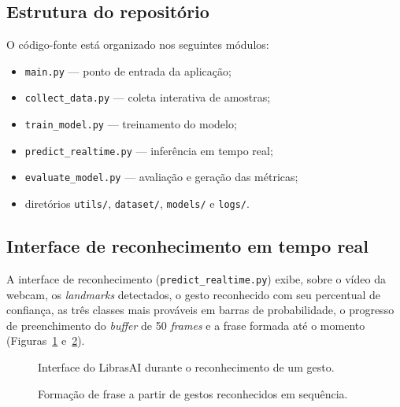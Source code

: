 \subsection{Estrutura do repositório}

O código-fonte está organizado nos seguintes módulos:

\begin{itemize}[leftmargin=2cm]
  \item \texttt{main.py} — ponto de entrada da aplicação;
  \item \texttt{collect\_data.py} — coleta interativa de amostras;
  \item \texttt{train\_model.py} — treinamento do modelo;
  \item \texttt{predict\_realtime.py} — inferência em tempo real;
  \item \texttt{evaluate\_model.py} — avaliação e geração das métricas;
  \item diretórios \texttt{utils/}, \texttt{dataset/}, \texttt{models/} e
  \texttt{logs/}.
\end{itemize}

\subsection{Interface de reconhecimento em tempo real}

A interface de reconhecimento (\texttt{predict\_realtime.py}) exibe, sobre o vídeo
da webcam, os \textit{landmarks} detectados, o gesto reconhecido com seu
percentual de confiança, as três classes mais prováveis em barras de
probabilidade, o progresso de preenchimento do \textit{buffer} de 50
\textit{frames} e a frase formada até o momento (Figuras~\ref{fig:interface}
e~\ref{fig:frase}).

\begin{figure}[htbp]
\centering
{}
\caption{Interface do LibrasAI durante o reconhecimento de um gesto.}
\label{fig:interface}
\end{figure}

\begin{figure}[htbp]
\centering
{}
\caption{Formação de frase a partir de gestos reconhecidos em sequência.}
\label{fig:frase}
\end{figure}

